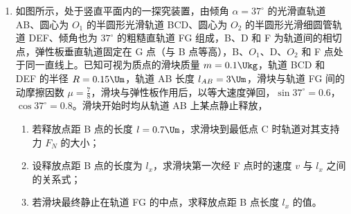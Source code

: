 \documentclass[\gkver]{gaokaozhenti}
\begin{document}
\begin{enumerate}
{	$x_{2}=v_{1}t_{2}+\frac{1}{2}a_{2}t_{2}^{2}$

	$a_{2}=2\Umsq$

	过 C 点的速度大小

	$v=v_{1}+a_{2}t_{2}=12\Ums$

	（3）在 BC 段由牛顿第二定律

	$mg\sin\theta-F_{\text{f}}=ma_{2}$

	解得

	$F_{\text{f}}=66\UN$。
}

\item
如图所示，处于竖直平面内的一探究装置，由倾角 $\alpha=37^{\circ}$ 的光滑直轨道 AB、圆心为 $O_{1}$ 的半圆形光滑轨道 BCD、圆心为 $O_{2}$ 的半圆形光滑细圆管轨道 DEF、倾角也为 $37^{\circ}$ 的粗糙直轨道 FG 组成，B、D 和 F 为轨道间的相切点，弹性板垂直轨道固定在 G 点（与 B 点等高），B、$O_{1}$、D、$O_{2}$ 和 F 点处于同一直线上。已知可视为质点的滑块质量 $m=0.1\Ukg$，轨道 BCD 和 DEF 的半径 $R=0.15\Um$，轨道 AB 长度 $l_{AB}=3\Um$，滑块与轨道 FG 间的动摩擦因数 $\mu=\frac{7}{8}$，滑块与弹性板作用后，以等大速度弹回，$\sin37^{\circ}=0.6$，$\cos37^{\circ}=0.8$。滑块开始时均从轨道 AB 上某点静止释放，


\begin{enumerate}
	\item
	若释放点距 B 点的长度 $l=0.7\Um$，求滑块到最低点 C 时轨道对其支持力 $F_{N}$ 的大小；

	\item
	设释放点距 B 点的长度为 $l_{x}$，求滑块第一次经 F 点时的速度 $v$ 与 $l_{x}$ 之间的关系式；

	\item
	若滑块最终静止在轨道 FG 的中点，求释放点距 B 点长度 $l_{x}$ 的值。
\end{enumerate}

\end{enumerate}
\end{document}
